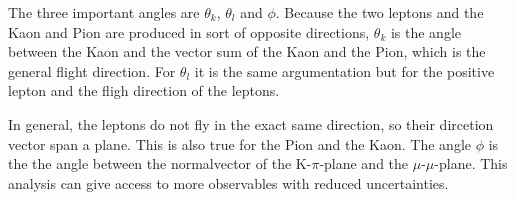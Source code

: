 The three important angles are $\theta_{k}$, $\theta_{l}$ and $\phi$.
Because the two leptons and the Kaon and Pion are produced in sort of opposite directions, $\theta_{k}$ is the angle between the Kaon and the vector sum of the Kaon and the Pion, which is the general flight direction.
For $\theta_{l}$ it is the same argumentation but for the positive lepton and the fligh direction of the leptons.

In general, the leptons do not fly in the exact same direction, so their dircetion vector span a plane.
This is also true for the Pion and the Kaon.
The angle $\phi$ is the the angle between the normalvector of the K-$\pi$-plane and the $\mu$-$\mu$-plane.
This analysis can give access to more observables with reduced uncertainties.
%
%
%
%
%
%
%
%
%
%
%
%
%
%
%
%
%



